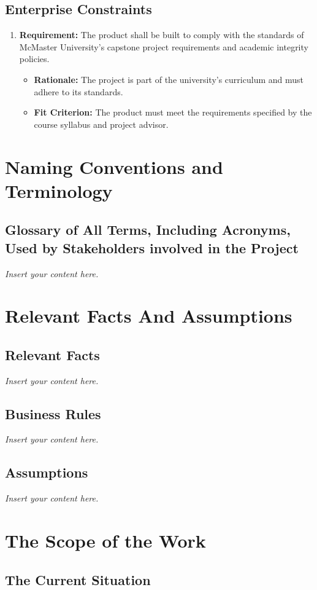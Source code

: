 \documentclass[12pt]{article}
\newcommand{\lips}{\textit{Insert your content here.}}
\begin{document}
\subsection{Enterprise Constraints}
\begin{enumerate}
    \item \textbf{Requirement:} The product shall be built to comply with the standards of McMaster University’s capstone project requirements and academic integrity policies.
    \begin{itemize}
        \item \textbf{Rationale:} The project is part of the university’s curriculum and must adhere to its standards.
        \item \textbf{Fit Criterion:} The product must meet the requirements specified by the course syllabus and project advisor.
    \end{itemize}
\end{enumerate}

\section{Naming Conventions and Terminology}
\subsection{Glossary of All Terms, Including Acronyms, Used by Stakeholders
involved in the Project}
\lips

\section{Relevant Facts And Assumptions}
\subsection{Relevant Facts}
\lips
\subsection{Business Rules}
\lips
\subsection{Assumptions}
\lips

\section{The Scope of the Work}
\subsection{The Current Situation}
\end{document}

